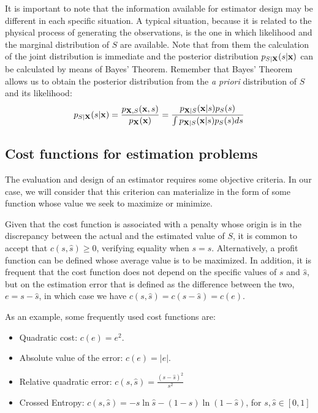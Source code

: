 
It is important to note that the information available for estimator design may be different in each specific situation. A typical situation, because it is related to the physical process of generating the observations, is the one in which likelihood and the marginal distribution of $S$ are available. Note that from them the calculation of the joint distribution is immediate and the posterior distribution $p_{S|{\bf X}}(s|{\bf x})$ can be calculated by means of Bayes' Theorem. Remember that Bayes' Theorem allows us to obtain the posterior distribution from the {\em a priori} distribution of $S$ and its likelihood:
\begin{equation}
p_{S|{\bf X}}(s|{\bf x}) = \frac{p_{{\bf X},S}({\bf x},s)} {p_{\bf X}({\bf x})} = \frac{p_{{\bf X}|S}({\bf x}|s) p_S(s)}{\int p_{{\bf X}|S}({\bf x}|s) p_S(s) ds}
\end{equation}


\subsection{Cost functions for estimation problems}
\label{subsec_funcion_coste}


The evaluation and design of an estimator requires some objective criteria. In our case, we will consider that this criterion can materialize in the form of some function whose value we seek to maximize or minimize. %

Given that the cost function is associated with a penalty whose origin is in the discrepancy between the actual and the estimated value of $S$, it is common to accept that $c(s,\hat s) \geq 0$, verifying equality when $s = \hat s$. Alternatively, a profit function can be defined whose average value is to be maximized. In addition, it is frequent that the cost function does not depend on the specific values of $s$ and $\hat s$, but on the estimation error that is defined as the difference between the two, $e = s - \hat s$, in which case we have $c(s,\hat s) = c(s - \hat s) = c(e)$.

As an example, some frequently used cost functions are:
\begin{itemize}
\item Quadratic cost: $c(e) = e^2$.
\item Absolute value of the error: $c(e) = |e|$.
\item Relative quadratic error: $c(s,\hat s) = \frac{(s-\hat{s})^2}{s^2}$
\item Crossed Entropy: $c(s,\hat s) = - s \ln \hat s - (1-s) \ln (1-\hat s)$, for $s,\hat{s}\in [0,1]$
\end{itemize}

